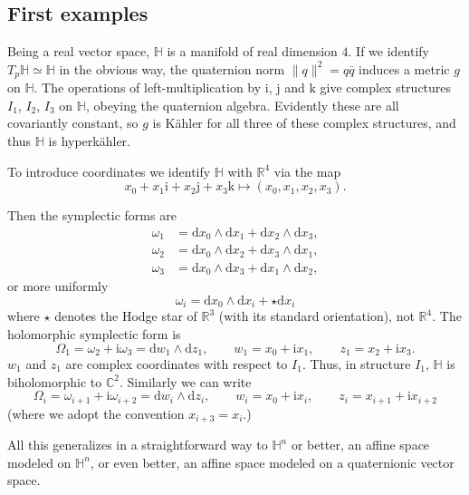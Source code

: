 \documentclass[12pt,letterpaper,reqno]{article}
\numberwithin{equation}{section}
\newcommand{\R}{\ensuremath{\mathbb R}}
\newcommand{\C}{\ensuremath{\mathbb C}}
\newcommand{\bbH}{\ensuremath{\mathbb H}}
\newcommand{\kahler}{K\"ahler\xspace}
\newcommand{\hk}{hyperk\"ahler\xspace}
\newcommand{\I}{{\mathrm i}}
\newcommand{\J}{{\mathrm j}}
\newcommand{\K}{{\mathrm k}}
\newcommand{\de}{\mathrm{d}}
\newcommand{\norm}[1]{\lVert#1\rVert}
\begin{document}
\subsection{First examples}

\begin{example} \label{exa:R4}
Being a real vector space, $\bbH$ is
a manifold of real dimension $4$.
If we identify $T_p \bbH \simeq \bbH$ in the obvious way,
the quaternion norm $\norm{q}^2 = q \bar{q}$
induces a metric $g$ on $\bbH$.
The operations of left-multiplication by $\I$, $\J$ and $\K$
give complex structures $I_1$, $I_2$, $I_3$ on $\bbH$,
obeying the quaternion algebra.
Evidently these are all covariantly constant, so
$g$ is \kahler for all three of these complex
structures, and thus $\bbH$ is \hk.

To introduce coordinates we
identify $\bbH$ with $\R^4$
via the map
\begin{equation}
  x_0 + x_1 \I + x_2 \J + x_3 \K \mapsto (x_0,x_1,x_2,x_3).
\end{equation}

Then the symplectic forms are
\begin{align}
  \omega_1 &= \de x_0 \wedge \de x_1 + \de x_2 \wedge \de x_3, \\
  \omega_2 &= \de x_0 \wedge \de x_2 + \de x_3 \wedge \de x_1, \\
  \omega_3 &= \de x_0 \wedge \de x_3 + \de x_1 \wedge \de x_2,
\end{align}
or more uniformly
\begin{equation} \label{eq:symplectic-forms-R4}
  \omega_i = \de x_0 \wedge \de x_i + \star \de x_i
\end{equation}
where $\star$ denotes the Hodge star of $\R^3$ (with its
standard orientation), not $\R^4$.
The holomorphic symplectic form is
\begin{equation}
  \Omega_1 = \omega_2 + \I \omega_3 = \de w_1 \wedge \de z_1, \qquad w_1 = x_0 + \I x_1, \qquad z_1 = x_2 + \I x_3.
\end{equation}
$w_1$ and $z_1$ are complex coordinates with respect to $I_1$.
Thus, in structure $I_1$, $\bbH$ is biholomorphic to $\C^2$.
Similarly we can write
\begin{equation} \label{eq:Omega-i-R4}
  \Omega_i = \omega_{i+1} + \I \omega_{i+2} = \de w_i \wedge \de z_i, \qquad w_i = x_0 + \I x_i, \qquad z_i = x_{i+1} + \I x_{i+2}
\end{equation}
(where we adopt the convention $x_{i+3} = x_i$.)

All this generalizes in a straightforward way to $\bbH^n$
or better, an affine space modeled on $\bbH^n$, or even
better, an affine space modeled on a quaternionic vector space.
\end{example}
\end{document}
